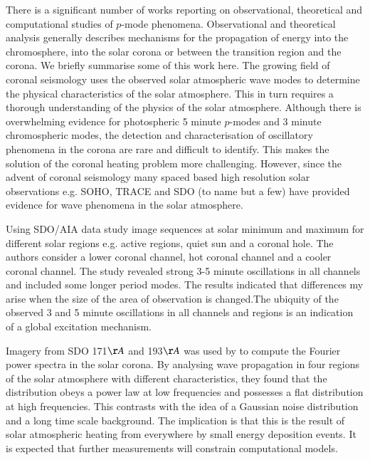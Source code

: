 \documentclass[preprint,authoryear,12pt]{elsarticle}
\begin{document}
There is a significant number of works reporting on observational, theoretical and computational studies of $p$-mode phenomena. Observational and theoretical analysis generally describes mechanisms for the propagation of energy into the chromosphere, into the solar corona or between the transition region and the corona. We briefly summarise some of this work here. The growing field of coronal seismology uses the observed solar atmospheric wave modes to determine the physical characteristics of the solar atmosphere. This in turn requires a thorough understanding of the physics of the solar atmosphere. Although there is overwhelming evidence for photospheric 5 minute $p$-modes and 3 minute chromospheric modes, the detection and characterisation of oscillatory phenomena in the corona are rare and difficult to identify. This makes the solution of the coronal heating problem more challenging. However, since the advent of coronal seismology \citep[see e.g][]{Roberts1984, DeMoortel2005} many spaced based high resolution solar observations e.g. SOHO, TRACE and SDO (to name but a few) have provided evidence for wave phenomena in the solar atmosphere.

Using SDO/AIA data \citet{Erdelyi2017} study image sequences at solar minimum and maximum for different solar regions e.g. active regions, quiet sun and a coronal hole. The authors consider a lower coronal channel, hot coronal channel and a cooler coronal channel. The study revealed strong 3-5 minute oscillations in all channels and included some longer period modes. The results indicated that differences my arise when the size of the area of observation is changed.The ubiquity of the observed 3 and 5 minute oscillations in all channels and regions is an indication of a global excitation mechanism.

Imagery from SDO 171$\AA$ and 193$\AA$ was used by \citet{Ireland2015} to compute the Fourier power spectra in the solar corona. By analysing wave propagation in four regions of the solar atmosphere with different characteristics, they found that the distribution obeys a power law at low frequencies and possesses a flat distribution at high frequencies. This contrasts with the idea of a Gaussian noise distribution and a long time scale background. The implication is that this is the result of solar atmospheric heating from everywhere by small energy deposition events. It is expected that further measurements will constrain computational models. 
\end{document}
